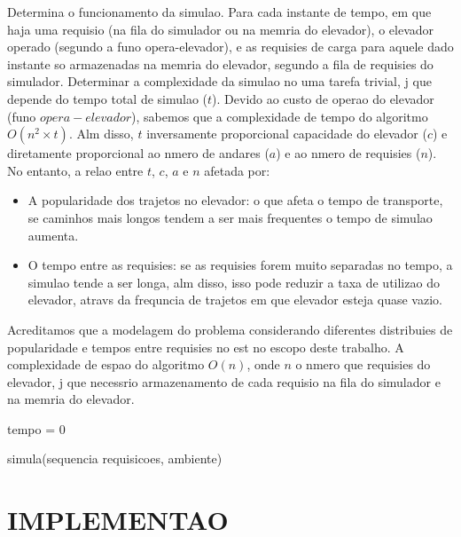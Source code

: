 \documentclass[12pt]{article}
\begin{document}
Determina o funcionamento da simulao. Para cada instante de tempo, em que haja uma requisio (na fila do simulador ou na memria do elevador), o elevador  operado (segundo a funo opera-elevador), e as requisies de carga para aquele dado instante so armazenadas na memria do elevador, segundo a fila de requisies do simulador. Determinar a complexidade da simulao no  uma tarefa trivial, j que depende do tempo total de simulao ($t$). Devido ao custo de operao do elevador (funo $opera-elevador$), sabemos que a complexidade de tempo do algoritmo  $O(n^2\times t)$. Alm disso, $t$  inversamente proporcional  capacidade do elevador ($c$) e diretamente proporcional ao nmero de andares ($a$) e ao nmero de requisies ($n$). No entanto, a relao entre $t$, $c$, $a$ e $n$  afetada por:
\begin{itemize}
\item A popularidade dos trajetos no elevador: o que afeta o tempo de transporte, se caminhos mais longos tendem a ser mais frequentes o tempo de simulao aumenta.
\item O tempo entre as requisies: se as requisies forem muito separadas no tempo, a simulao tende a ser longa, alm disso, isso pode reduzir a taxa de utilizao do elevador, atravs da frequncia de trajetos em que elevador esteja quase vazio.
\end{itemize}

Acreditamos que a modelagem do problema considerando diferentes distribuies de popularidade e tempos entre requisies no est no escopo deste trabalho. A complexidade de espao do algoritmo  $O(n)$, onde $n$  o nmero que requisies do elevador, j que  necessrio  armazenamento de cada requisio na fila do simulador e na memria do elevador.
\begin{algorithm}[h!]
\begin{footnotesize}

	tempo = 0\;

\caption{simula(sequencia requisicoes, ambiente)}%
\end{footnotesize}
\end{algorithm}

\section{IMPLEMENTAO}
\label{implementacao}

\end{document}
